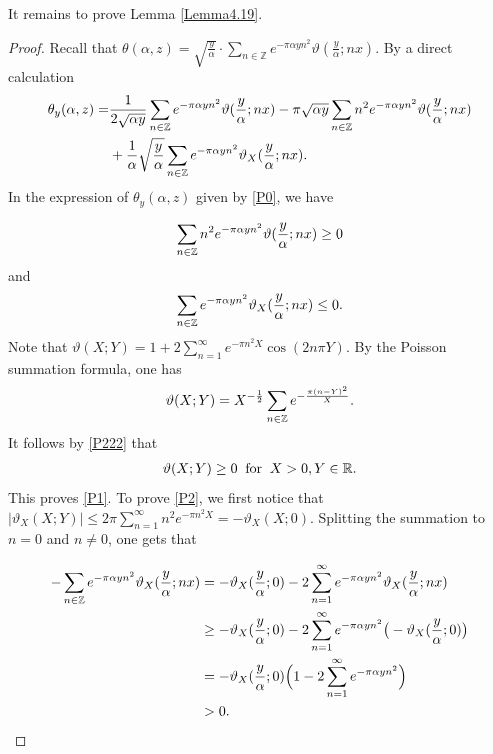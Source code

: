 \documentclass[reqno,english]{amsart}
\newtheorem{open problem}{Open Problem}[section]
\newtheorem{open question}{Open Question}[section]
\newtheorem{open questions on hexagonal lattice}{Open Questions on hexagonal lattice}[section]
\begin{document}
It remains to prove Lemma \ref{Lemma4.19}.

\begin{proof} Recall that $\theta(\alpha,z)=\sqrt{\frac{y}{\alpha}}\cdot\sum_{n\in\mathbb{Z}} e^{-\pi\alpha yn^2}\vartheta(\frac{y}{\alpha};nx)$. By a direct calculation
 \begin{equation}\aligned\label{P0}
\theta_y(\alpha,z)=&\frac{1}{2\sqrt{\alpha y}}\sum_{n\in\mathbb{Z}} e^{-\pi\alpha yn^2}\vartheta(\frac{y}{\alpha};nx)
-\pi\sqrt{\alpha y}\sum_{n\in\mathbb{Z}} n^2e^{-\pi\alpha yn^2}\vartheta(\frac{y}{\alpha};nx)\\
&+\frac{1}{\alpha}\sqrt{\frac{y}{\alpha}}\sum_{n\in\mathbb{Z}} e^{-\pi\alpha yn^2}\vartheta_X(\frac{y}{\alpha};nx).
 \endaligned\end{equation}
 In the expression of $\theta_y(\alpha,z)$ given by \eqref{P0}, we have

 \begin{equation}\aligned\label{P1}
\sum_{n\in\mathbb{Z}} n^2e^{-\pi\alpha yn^2}\vartheta(\frac{y}{\alpha};nx)\geq0
 \endaligned\end{equation}
and
 \begin{equation}\aligned\label{P2}
\sum_{n\in\mathbb{Z}} e^{-\pi\alpha yn^2}\vartheta_X(\frac{y}{\alpha};nx)
\leq0.
 \endaligned\end{equation}
 Note that $\vartheta(X;Y)=1+2\sum_{n=1}^\infty e^{-\pi n^2X}\cos(2n\pi Y)$.
 By the Poisson summation formula, one has
  \begin{equation}\aligned\label{P222}
\vartheta(X;Y)=X^{-\frac{1}{2}}\sum_{n\in\mathbb{Z}} e^{-\frac{\pi(n-Y)^2}{X}}.
 \endaligned\end{equation}
 It follows by \eqref{P222} that
  \begin{equation}\aligned\label{Positive}
\vartheta(X;Y)\geq0\;\;\hbox{for}\;\; X>0, Y\in\mathbb{R}.
 \endaligned\end{equation}
This proves \eqref{P1}. To prove \eqref{P2}, we first notice that $|\vartheta_X(X;Y)|\leq2\pi\sum_{n=1}^\infty n^2e^{-\pi n^2X}=-\vartheta_X(X;0)$. Splitting the summation to $n=0$ and $n\neq0$, one gets that

\begin{equation}\aligned\nonumber
-\sum_{n\in\mathbb{Z}} e^{-\pi\alpha yn^2}\vartheta_X(\frac{y}{\alpha};nx)
&=-\vartheta_X(\frac{y}{\alpha};0)-2\sum_{n=1}^\infty e^{-\pi\alpha yn^2}\vartheta_X(\frac{y}{\alpha};nx)\\
&\geq-\vartheta_X(\frac{y}{\alpha};0)-2\sum_{n=1}^\infty e^{-\pi\alpha yn^2}\big(-\vartheta_X(\frac{y}{\alpha};0)\big)\\
&=-\vartheta_X(\frac{y}{\alpha};0)
\Big(
1-2\sum_{n=1}^\infty e^{-\pi\alpha yn^2}
\Big)\\
&>0.
 \endaligned\end{equation}



\end{proof}
\end{document}
